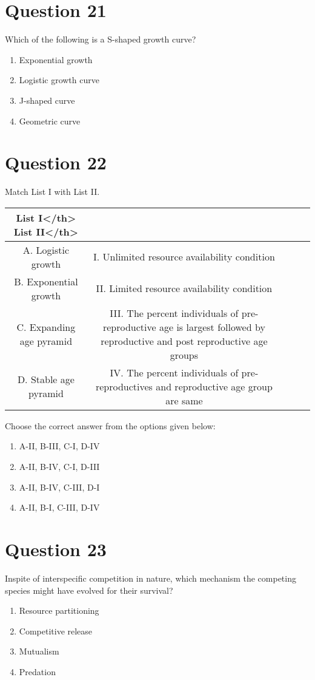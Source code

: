 \documentclass{article}
\begin{document}
\section*{Question 21}
Which of the following is a S-shaped growth curve?
\begin{enumerate}[label=(\alph*)]
\item Exponential growth
\item Logistic growth curve
\item J-shaped curve
\item Geometric curve
\end{enumerate}
\newpage
\section*{Question 22}
Match List I with List II. \begin{tabular}{|c|c|c|c|c|}
\hline
\textbf{List I</th> List II</th>} \\
\hline
A. Logistic growth & I. Unlimited resource availability condition \\
\hline
B. Exponential growth & II. Limited resource availability condition \\
\hline
C. Expanding age pyramid & III. The percent individuals of pre-reproductive age is largest followed by reproductive and post reproductive age groups \\
\hline
D. Stable age pyramid & IV. The percent individuals of pre-reproductives and reproductive age group are same \\
\hline
\end{tabular}
 Choose the correct answer from the options given below:\newline 
\begin{enumerate}[label=(\alph*)]
\item  A-II, B-III, C-I, D-IV 
\item  A-II, B-IV, C-I, D-III
\item  A-II, B-IV, C-III, D-I 
\item  A-II, B-I, C-III, D-IV
\end{enumerate}
\newpage
\section*{Question 23}
 Inspite of interspecific competition in nature, which mechanism the competing species might have evolved for their survival? 
\begin{enumerate}[label=(\alph*)]
\item  Resource partitioning
\item  Competitive release
\item  Mutualism
\item  Predation
\end{enumerate}
\newpage
\end{document}
